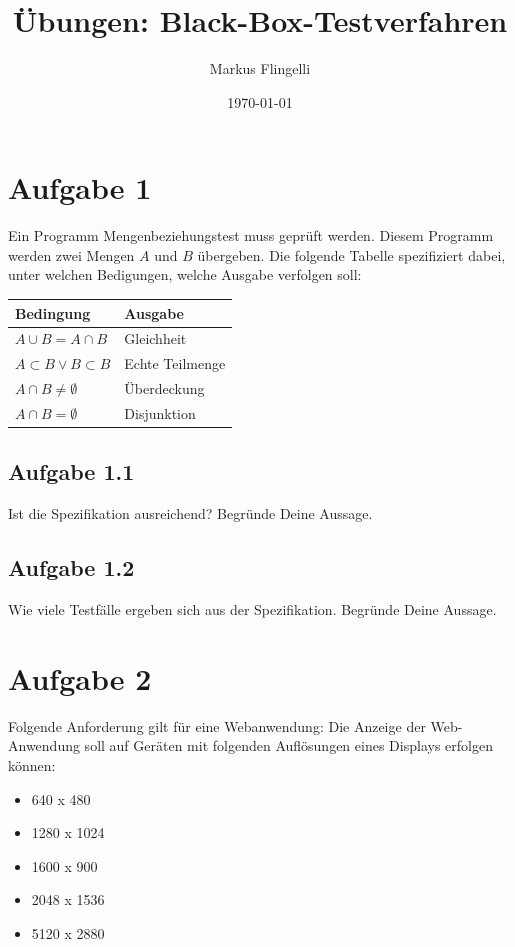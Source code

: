 

\title{Übungen: Black-Box-Testverfahren}
\author{Markus Flingelli}
\date{\today}


\maketitle

\section*{Aufgabe 1}
Ein Programm Mengenbeziehungstest muss geprüft werden. Diesem Programm werden zwei Mengen $A$ und $B$ übergeben. Die folgende Tabelle spezifiziert dabei, unter welchen Bedigungen, welche Ausgabe verfolgen soll:

\vspace{.3cm}

\begin{tabular}{|l|l|}
\hline
\textbf{Bedingung} & \textbf{Ausgabe}\\ \hline
$A \cup B = A \cap B$ & Gleichheit\\ \hline
$A \subset B \lor B \subset B$ & Echte Teilmenge\\ \hline
$A \cap B \neq \emptyset$ & Überdeckung\\ \hline
$A \cap B = \emptyset$ & Disjunktion\\ \hline
\end{tabular}

\subsection*{Aufgabe 1.1}
Ist die Spezifikation ausreichend? Begründe Deine Aussage.

\subsection*{Aufgabe 1.2}
Wie viele Testfälle ergeben sich aus der Spezifikation. Begründe Deine Aussage.

\newpage
\section*{Aufgabe 2}

Folgende Anforderung gilt für eine Webanwendung: Die Anzeige der Web-Anwendung soll auf Geräten mit folgenden Auflösungen eines Displays erfolgen können:

\begin{itemize}
  \item 640 x 480
  \item 1280 x 1024
  \item 1600 x 900
  \item 2048 x 1536
  \item 5120 x 2880
\end{itemize}

